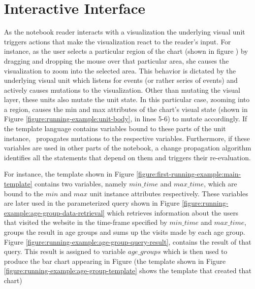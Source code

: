 \section{Interactive Interface}
\label{section:interactive-interface}



As the notebook reader interacts with a visualization the underlying visual unit triggers actions that make the visualization react to the reader's input. For instance, as the user selects a particular region of the chart (shown in figure ) by dragging and dropping the mouse over that particular area, she causes the visualization to zoom into the selected area. This behavior is dictated by the underlying visual unit which listens for events (or rather series of events) and actively causes mutations to the visualization. Other than mutating the visual layer, these units also mutate the unit state. In this particular case, zooming into a region, causes the min and max attributes of the chart's visual state (shown in Figure \ref{figure:running-example:unit-body}, in lines 5-6) to mutate accordingly. If the template language contains variables bound to these parts of the unit instance, \projname\ propagates mutations to the respective variables. Furthermore, if these variables are used in other parts of the notebook, a change propagation algorithm identifies all the statements that depend on them and triggers their re-evaluation.




For instance, the template shown in Figure \ref{figure:first-running-example:main-template} contains two variables, namely $min\_time$ and $max\_time$, which are bound to the $min$ and $max$ unit instance attributes respectively. These variables are later used in the parameterized query shown in Figure \ref{figure:running-example:age-group-data-retrieval} which retrieves information about the users that visited the website in the time-frame specified by $min\_time$ and $max\_time$, groups the result in age groups and sums up the visits made by each age group. Figure \ref{figure:running-example:age-group-query-result}, contains the result of that query. This result is assigned to variable $age\_groups$ which is then used to produce the bar chart appearing in Figure  (the template shown in Figure \ref{figure:running-example:age-group-template} shows the template that created that chart)


